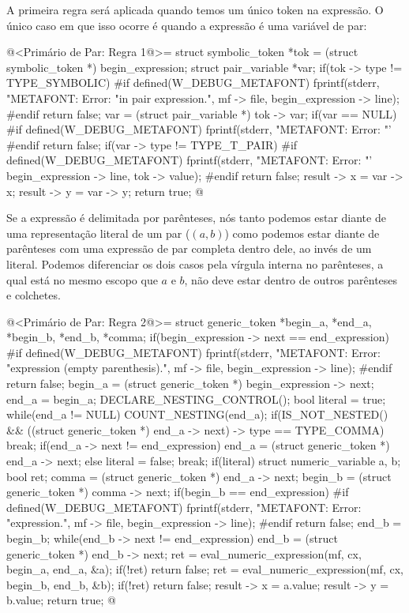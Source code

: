 A primeira regra será aplicada quando temos um único token na
expressão. O único caso em que isso ocorre é quando a expressão é uma
variável de par:

\iniciocodigo
@<Primário de Par: Regra 1@>=
struct symbolic_token *tok = (struct symbolic_token *) begin_expression;
struct pair_variable *var;
if(tok -> type != TYPE_SYMBOLIC){
#if defined(W_DEBUG_METAFONT)
  fprintf(stderr, "METAFONT: Error: %
          "in pair expression.",  mf -> file, begin_expression -> line);
#endif
  return false;
}
var = (struct pair_variable *) tok -> var;
if(var == NULL){
#if defined(W_DEBUG_METAFONT)
  fprintf(stderr, "METAFONT: Error: %
          "'%
#endif
  return false;
}
if(var -> type != TYPE_T_PAIR){
#if defined(W_DEBUG_METAFONT)
  fprintf(stderr, "METAFONT: Error: %
          "'%
          begin_expression -> line, tok -> value);
#endif
  return false;
}
result -> x = var -> x;
result -> y = var -> y;
return true;
@
\fimcodigo

Se a expressão é delimitada por parênteses, nós tanto podemos estar
diante de uma representação literal de um par ($(a, b)$) como podemos
estar diante de parênteses com uma expressão de par completa dentro
dele, ao invés de um literal. Podemos diferenciar os dois casos pela
vírgula interna no parênteses, a qual está no mesmo escopo que $a$ e
$b$, não deve estar dentro de outros parênteses e colchetes.

\iniciocodigo
@<Primário de Par: Regra 2@>=
  struct generic_token *begin_a, *end_a, *begin_b, *end_b, *comma;
  if(begin_expression -> next == end_expression){
#if defined(W_DEBUG_METAFONT)
      fprintf(stderr, "METAFONT: Error: %
              "expression (empty parenthesis).\n ", mf -> file,
              begin_expression -> line);
#endif
    return false;
  }
  begin_a = (struct generic_token *) begin_expression -> next;
  end_a = begin_a;
  DECLARE_NESTING_CONTROL();
  bool literal = true;
  while(end_a != NULL){
    COUNT_NESTING(end_a);
    if(IS_NOT_NESTED() &&
       ((struct generic_token *) end_a -> next) -> type == TYPE_COMMA)
      break;
    if(end_a -> next != end_expression)
      end_a = (struct generic_token *) end_a -> next;
    else{
      literal = false;
      break;
    }
  }
  if(literal){
    struct numeric_variable a, b;
    bool ret;
    comma = (struct generic_token *) end_a -> next;
    begin_b = (struct generic_token *) comma -> next;
    if(begin_b == end_expression){
#if defined(W_DEBUG_METAFONT)
      fprintf(stderr, "METAFONT: Error: %
              "expression.\n ", mf -> file, begin_expression -> line);
#endif
      return false;
    }
    end_b = begin_b;
    while(end_b -> next != end_expression)
      end_b = (struct generic_token *) end_b -> next;
    ret = eval_numeric_expression(mf, cx, begin_a, end_a, &a);
    if(!ret)
      return false;
    ret = eval_numeric_expression(mf, cx, begin_b, end_b, &b);
    if(!ret)
      return false;
    result -> x = a.value;
    result -> y = b.value;
    return true;
  }
@
\fimcodigo

